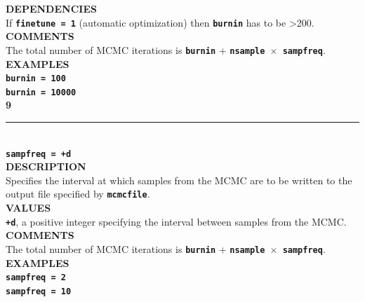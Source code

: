 \documentclass[a4paper]{book}
\numberwithin{equation}{section} \renewcommand{\baselinestretch}{0.55}
\begin{document}
\textbf{DEPENDENCIES} \vspace{5pt}\\
If \textbf{\texttt{finetune = 1}} (automatic optimization) then \textbf{\texttt{burnin}} has to be >200. \vspace{5pt}\\
\textbf{COMMENTS} \vspace{5pt}\\
The total number of MCMC iterations is \textbf{\texttt{burnin}} + \textbf{\texttt{nsample $\times$ sampfreq}}. \vspace{5pt}\\
\textbf{EXAMPLES} \vspace{5pt}\\
\textbf{\texttt{burnin = 100}} \vspace{5pt}\\
\textbf{\texttt{burnin = 10000}}\vspace{10pt}\\
\textbf{{\large 9}} \\
\noindent\rule{\textwidth}{0.8pt} \\
\textbf{{\Large \texttt{sampfreq = +d}}} \vspace{5pt}\\
\textbf{DESCRIPTION} \vspace{5pt}\\
Specifies the interval at which samples from the MCMC are to be written to the output file specified by \textbf{\texttt{mcmcfile}}. \vspace{5pt}\\
\textbf{VALUES} \vspace{5pt}\\
\textbf{\texttt{+d}}, a positive integer specifying the interval between samples from the MCMC. \vspace{5pt}\\
\textbf{COMMENTS} \vspace{5pt}\\
The total number of MCMC iterations is \textbf{\texttt{burnin}} + \textbf{\texttt{nsample $\times$ sampfreq}}. \vspace{5pt}\\
\textbf{EXAMPLES} \vspace{5pt}\\
\textbf{\texttt{sampfreq = 2}} \vspace{5pt}\\
\textbf{\texttt{sampfreq = 10}}\vspace{10pt}\\
\end{document}
